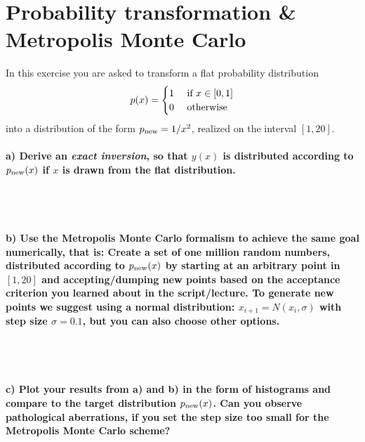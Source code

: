\documentclass[11 pt]{article}
\begin{document}
    \newpage
    \section{Probability transformation \& Metropolis Monte Carlo}
        In this exercise you are asked to transform a flat probability
        distribution
        \begin{equation}
            p(x)=\begin{cases}
                1&\textnormal{ if }x\in[0,1] \\
                0&\textnormal{ otherwise}
            \end{cases}
            \label{}
        \end{equation}
        into a distribution of the form $p_\textnormal{new}=1/x^2$, realized 
        on the interval $[1,20]$.

        \paragraph{a) Derive an \textit{exact inversion}, so that $y(x)$ is 
            distributed according to $p_\textnormal{new}(x)$ if $x$ is drawn 
            from the flat distribution.
        } \ \\
        \\

        \paragraph{b) Use the Metropolis Monte Carlo formalism to achieve the
            same goal numerically, that is: Create a set of one million random 
            numbers, distributed according to $p_\textnormal{new}(x)$ by 
            starting at an arbitrary point in $[1,20]$ and accepting/dumping new
            points based on the acceptance criterion you learned about in the 
            script/lecture. To generate new points we suggest using a normal 
            distribution: $x_{i+1}=N(x_i,\sigma)$ with step size $\sigma=0.1$,
            but you can also choose other options.
        } \ \\
        \\

        \paragraph{c) Plot your results from a) and b) in the form of 
            histograms and compare to the target distribution 
            $p_\textnormal{new}(x)$. Can you observe pathological aberrations,
            if you set the step size too small for the Metropolis Monte Carlo 
            scheme?
        }
\end{document}
